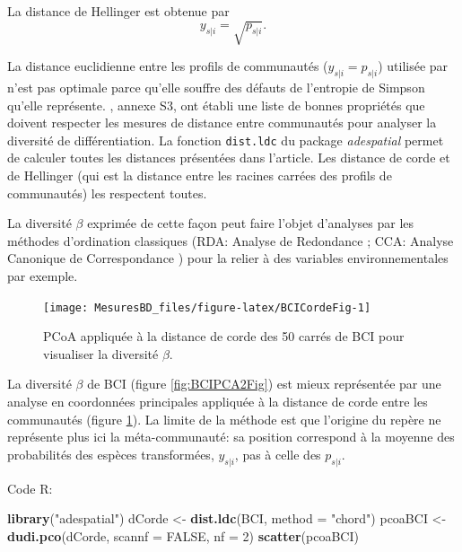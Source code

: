 \documentclass[
  11pt,
  french,
  a4paper,
  extrafontsizes,onecolumn,openright
  ]{memoir}
\newenvironment{Shaded}{\begin{snugshade}}{\end{snugshade}}
\newcommand{\DataTypeTok}[1]{\textcolor[rgb]{0.13,0.29,0.53}{#1}}
\newcommand{\DecValTok}[1]{\textcolor[rgb]{0.00,0.00,0.81}{#1}}
\newcommand{\KeywordTok}[1]{\textcolor[rgb]{0.13,0.29,0.53}{\textbf{#1}}}
\newcommand{\NormalTok}[1]{#1}
\newcommand{\OtherTok}[1]{\textcolor[rgb]{0.56,0.35,0.01}{#1}}
\newcommand{\StringTok}[1]{\textcolor[rgb]{0.31,0.60,0.02}{#1}}
\begin{document}
La distance de Hellinger est obtenue par
\begin{equation}
  \label{eq:Hellinger}
  y_{s|i} = \sqrt{p_{s|i}}.
\end{equation}

La distance euclidienne entre les profils de communautés (\(y_{s|i} = p_{s|i}\)) utilisée par \textcite{terBraak1983} n'est pas optimale parce qu'elle souffre des défauts de l'entropie de Simpson \autocite{Jost2007} qu'elle représente.
\textcite{Legendre2013}, annexe S3, ont établi une liste de bonnes propriétés que doivent respecter les mesures de distance entre communautés pour analyser la diversité de différentiation.
La fonction \texttt{dist.ldc} du package \emph{adespatial} permet de calculer toutes les distances présentées dans l'article.
Les distance de corde et de Hellinger (qui est la distance entre les racines carrées des profils de communautés) les respectent toutes.

La diversité \(\beta\) exprimée de cette façon peut faire l'objet d'analyses par les méthodes d'ordination classiques (RDA: Analyse de Redondance \autocite{Rao1964}; CCA: Analyse Canonique de Correspondance \autocite{Braak1986}) pour la relier à des variables environnementales par exemple\autocite{Legendre2013}.



\scriptsize

\begin{figure}

{\centering \texttt{[image: MesuresBD\_files/figure-latex/BCICordeFig-1]} 

}

\caption{PCoA appliquée à la distance de corde des 50 carrés de BCI pour visualiser la diversité \(\beta\).}\label{fig:BCICordeFig}
\end{figure}

\normalsize

La diversité \(\beta\) de BCI (figure \ref{fig:BCIPCA2Fig}) est mieux représentée par une analyse en coordonnées principales appliquée à la distance de corde entre les communautés (figure \ref{fig:BCICordeFig}).
La limite de la méthode est que l'origine du repère ne représente plus ici la méta-communauté: sa position correspond à la moyenne des probabilités des espèces transformées, \(y_{s|i}\), pas à celle des \(p_{s|i}\).

Code R:

\scriptsize

\begin{Shaded}
\begin{Highlighting}[]
\KeywordTok{library}\NormalTok{(}\StringTok{"adespatial"}\NormalTok{)}
\NormalTok{dCorde <-}\StringTok{ }\KeywordTok{dist.ldc}\NormalTok{(BCI, }\DataTypeTok{method =} \StringTok{"chord"}\NormalTok{)}
\NormalTok{pcoaBCI <-}\StringTok{ }\KeywordTok{dudi.pco}\NormalTok{(dCorde, }\DataTypeTok{scannf =} \OtherTok{FALSE}\NormalTok{, }\DataTypeTok{nf =} \DecValTok{2}\NormalTok{)}
\KeywordTok{scatter}\NormalTok{(pcoaBCI)}
\end{Highlighting}
\end{Shaded}
\end{document}

